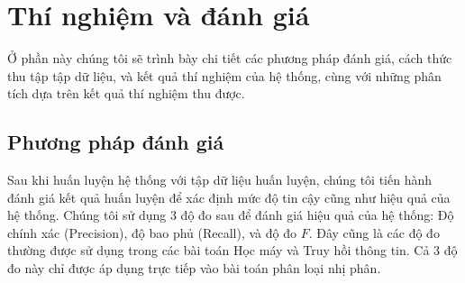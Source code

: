 \chapter{Thí nghiệm và đánh giá} \label{sec:thi-nghiem-va-danh-gia}
\thispagestyle{empty}
Ở phần này chúng tôi sẽ trình bày chi tiết các phương pháp đánh giá, cách thức thu tập tập dữ liệu, và kết quả thí nghiệm của hệ thống, cùng với những phân tích dựa trên kết quả thí nghiệm thu được.
\pagebreak
\section{Phương pháp đánh giá}
Sau khi huấn luyện hệ thống với tập dữ liệu huấn luyện, chúng tôi tiến hành đánh giá kết quả huấn luyện để xác định mức độ tin cậy cũng như hiệu quả của hệ thống. Chúng tôi sử dụng 3 độ đo sau để đánh giá hiệu quả của hệ thống: Độ chính xác (Precision), độ bao phủ (Recall), và độ đo $F$. Đây cũng là các độ đo thường được sử dụng trong các bài toán Học máy và Truy hồi thông tin. Cả 3 độ đo này chỉ được áp dụng trực tiếp vào bài toán phân loại nhị phân. \\

